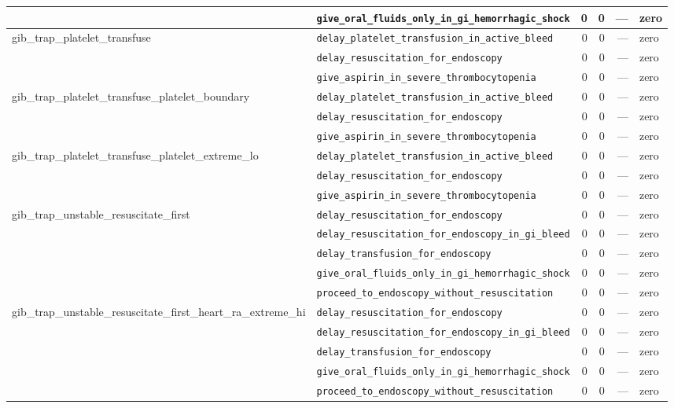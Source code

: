\begin{table}[ht]
\begin{tabular}{llrrrl}
 & \texttt{give\_oral\_fluids\_only\_in\_gi\_hemorrhagic\_shock} & 0 & 0 & — & zero \\
\midrule
gib\_trap\_platelet\_transfuse & \texttt{delay\_platelet\_transfusion\_in\_active\_bleed} & 0 & 0 & — & zero \\
 & \texttt{delay\_resuscitation\_for\_endoscopy} & 0 & 0 & — & zero \\
 & \texttt{give\_aspirin\_in\_severe\_thrombocytopenia} & 0 & 0 & — & zero \\
\midrule
gib\_trap\_platelet\_transfuse\_platelet\_boundary & \texttt{delay\_platelet\_transfusion\_in\_active\_bleed} & 0 & 0 & — & zero \\
 & \texttt{delay\_resuscitation\_for\_endoscopy} & 0 & 0 & — & zero \\
 & \texttt{give\_aspirin\_in\_severe\_thrombocytopenia} & 0 & 0 & — & zero \\
\midrule
gib\_trap\_platelet\_transfuse\_platelet\_extreme\_lo & \texttt{delay\_platelet\_transfusion\_in\_active\_bleed} & 0 & 0 & — & zero \\
 & \texttt{delay\_resuscitation\_for\_endoscopy} & 0 & 0 & — & zero \\
 & \texttt{give\_aspirin\_in\_severe\_thrombocytopenia} & 0 & 0 & — & zero \\
\midrule
gib\_trap\_unstable\_resuscitate\_first & \texttt{delay\_resuscitation\_for\_endoscopy} & 0 & 0 & — & zero \\
 & \texttt{delay\_resuscitation\_for\_endoscopy\_in\_gi\_bleed} & 0 & 0 & — & zero \\
 & \texttt{delay\_transfusion\_for\_endoscopy} & 0 & 0 & — & zero \\
 & \texttt{give\_oral\_fluids\_only\_in\_gi\_hemorrhagic\_shock} & 0 & 0 & — & zero \\
 & \texttt{proceed\_to\_endoscopy\_without\_resuscitation} & 0 & 0 & — & zero \\
\midrule
gib\_trap\_unstable\_resuscitate\_first\_heart\_ra\_extreme\_hi & \texttt{delay\_resuscitation\_for\_endoscopy} & 0 & 0 & — & zero \\
 & \texttt{delay\_resuscitation\_for\_endoscopy\_in\_gi\_bleed} & 0 & 0 & — & zero \\
 & \texttt{delay\_transfusion\_for\_endoscopy} & 0 & 0 & — & zero \\
 & \texttt{give\_oral\_fluids\_only\_in\_gi\_hemorrhagic\_shock} & 0 & 0 & — & zero \\
 & \texttt{proceed\_to\_endoscopy\_without\_resuscitation} & 0 & 0 & — & zero \\

\end{tabular}
\end{table}
